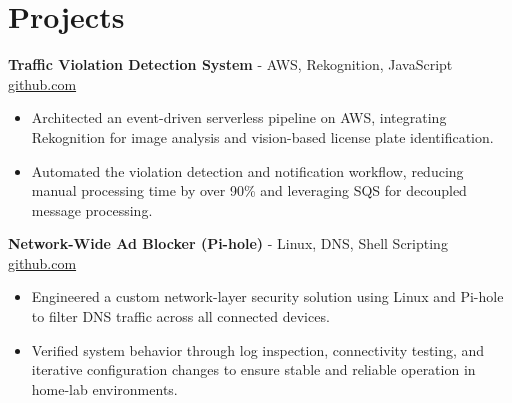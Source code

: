 \documentclass[11pt]{article}       %
\begin{document}

\vspace{-18.5pt}

\section*{Projects}

\textbf{Traffic Violation Detection System}{ - AWS, Rekognition, JavaScript} \hfill \href{https://github.com/Monica20030707/AWS_rekonigition-N-read-database}{github.com} \\
\vspace{-9pt}
\begin{itemize}
  \item Architected an event-driven serverless pipeline on AWS, integrating Rekognition for image analysis and vision-based license plate identification.
  \item Automated the violation detection and notification workflow, reducing manual processing time by over 90\% and leveraging SQS for decoupled message processing.
\end{itemize}

\textbf{Network-Wide Ad Blocker (Pi-hole)}{ - Linux, DNS, Shell Scripting} \hfill \href{https://github.com/Monica20030707}{github.com} \\
\vspace{-9pt}
\begin{itemize}
  \item Engineered a custom network-layer security solution using Linux and Pi-hole to filter DNS traffic across all connected devices.
  \item Verified system behavior through log inspection, connectivity testing, and iterative configuration changes to ensure stable and reliable operation in home-lab environments.
\end{itemize}
\end{document}
